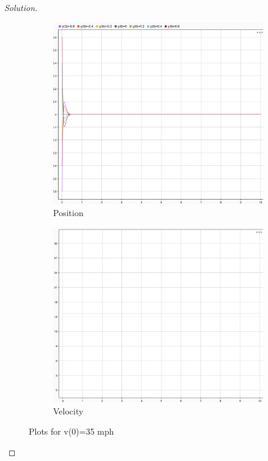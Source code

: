 \documentclass{article}
\begin{document}
\begin{proof}[Solution]
  \begin{figure}[h!]
    \centering
    \begin{subfigure}{0.4\linewidth}
      \includegraphics[width=\linewidth]{img18.png}
      \caption{Position}
    \end{subfigure}
    \begin{subfigure}{0.4\linewidth}
      \includegraphics[width=\linewidth]{img19.png}
      \caption{Velocity}
    \end{subfigure}
    \caption{Plots for v(0)=35 mph}
  \end{figure}


\end{proof}
\end{document}
